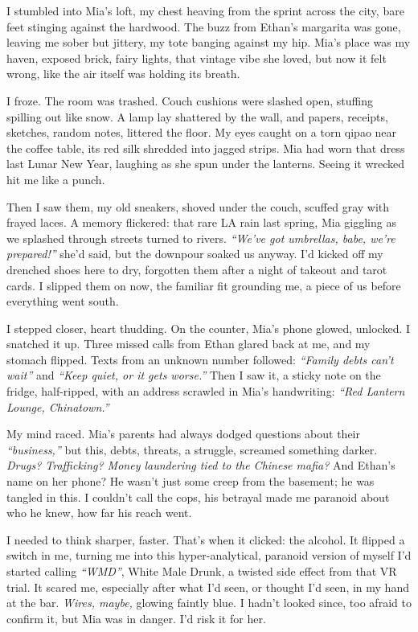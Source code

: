 \documentclass[12pt]{article}
\begin{document}
I stumbled into \textnormal{Mia}’s loft, my chest heaving from the sprint across the city, bare feet stinging against the hardwood. The buzz from \textnormal{Ethan}’s margarita was gone, leaving me sober but jittery, my tote banging against my hip. \textnormal{Mia}’s place was my haven, exposed brick, fairy lights, that vintage vibe she loved, but now it felt wrong, like the air itself was holding its breath.

I froze. The room was trashed. Couch cushions were slashed open, stuffing spilling out like snow. A lamp lay shattered by the wall, and papers, receipts, sketches, random notes, littered the floor. My eyes caught on a torn qipao near the coffee table, its red silk shredded into jagged strips. \textnormal{Mia} had worn that dress last Lunar New Year, laughing as she spun under the lanterns. Seeing it wrecked hit me like a punch.

Then I saw them, my old sneakers, shoved under the couch, scuffed gray with frayed laces. A memory flickered: that rare LA rain last spring, \textnormal{Mia} giggling as we splashed through streets turned to rivers. \textit{“We’ve got umbrellas, babe, we’re prepared!”} she’d said, but the downpour soaked us anyway. I’d kicked off my drenched shoes here to dry, forgotten them after a night of takeout and tarot cards. I slipped them on now, the familiar fit grounding me, a piece of us before everything went south.

I stepped closer, heart thudding. On the counter, \textnormal{Mia}’s phone glowed, unlocked. I snatched it up. Three missed calls from \textnormal{Ethan} glared back at me, and my stomach flipped. Texts from an unknown number followed: \textit{“Family debts can’t wait”} and \textit{“Keep quiet, or it gets worse.”} Then I saw it, a sticky note on the fridge, half-ripped, with an address scrawled in \textnormal{Mia}’s handwriting: \textit{“Red Lantern Lounge, Chinatown.”}

My mind raced. \textnormal{Mia}’s parents had always dodged questions about their \textit{“business,”} but this, debts, threats, a struggle, screamed something darker. \textit{Drugs? Trafficking? Money laundering tied to the Chinese mafia?} And \textnormal{Ethan}’s name on her phone? He wasn’t just some creep from the basement; he was tangled in this. I couldn’t call the cops, his betrayal made me paranoid about who he knew, how far his reach went.

I needed to think sharper, faster. That’s when it clicked: the alcohol. It flipped a switch in me, turning me into this hyper-analytical, paranoid version of myself I’d started calling \textit{“WMD”}, White Male Drunk, a twisted side effect from that VR trial. It scared me, especially after what I’d seen, or thought I’d seen, in my hand at the bar. \textit{Wires, maybe,} glowing faintly blue. I hadn’t looked since, too afraid to confirm it, but \textnormal{Mia} was in danger. I’d risk it for her.
\end{document}
